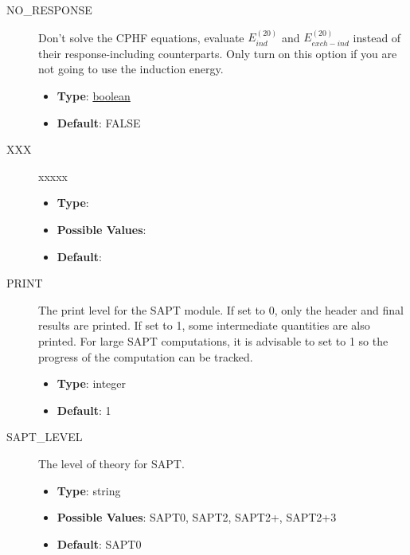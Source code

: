 \documentclass[letterpaper,10pt,english]{sphinxmanual}
\begin{document}
\begin{description}
\item[{NO\_RESPONSE}] \leavevmode{}\label{index:term-34}
Don't solve the CPHF equations, evaluate $E_{ind}^{(20)}$
and $E_{exch-ind}^{(20)}$ instead of their response-including
counterparts. Only turn on this option if you are not going to
use the induction energy.
\begin{itemize}
\item {} 
\textbf{Type}: {\hyperref[index:boolean]{boolean}}

\item {} 
\textbf{Default}: FALSE

\end{itemize}

\end{description}
\begin{description}
\item[{XXX}] \leavevmode{}\label{index:term-35}
xxxxx
\begin{itemize}
\item {} 
\textbf{Type}:

\item {} 
\textbf{Possible Values}:

\item {} 
\textbf{Default}:

\end{itemize}

\end{description}
\begin{description}
\item[{PRINT}] \leavevmode{}\label{index:term-36}
The print level for the SAPT module. If set to 0, only the header
and final results are printed. If set to 1, some intermediate
quantities are also printed. For large SAPT computations, it is
advisable to set to 1 so the progress of the computation can be
tracked.
\begin{itemize}
\item {} 
\textbf{Type}: integer

\item {} 
\textbf{Default}: 1

\end{itemize}

\end{description}
\begin{description}
\item[{SAPT\_LEVEL}] \leavevmode{}\label{index:term-37}
The level of theory for SAPT.
\begin{itemize}
\item {} 
\textbf{Type}: string

\item {} 
\textbf{Possible Values}: SAPT0, SAPT2, SAPT2+, SAPT2+3

\item {} 
\textbf{Default}: SAPT0

\end{itemize}

\end{description}
\end{document}

